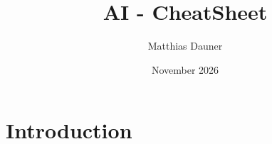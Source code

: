 \documentclass{article}
\title{AI - CheatSheet}
\author{Matthias Dauner }
\date{November 2026}
\begin{document}
\maketitle

\section{Introduction}
\end{document}
